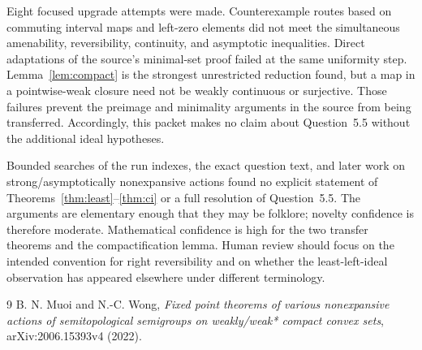 \documentclass[11pt]{article}
\theoremstyle{definition}
\theoremstyle{remark}
\begin{document}
Eight focused upgrade attempts were made.  Counterexample routes based on
commuting interval maps and left-zero elements did not meet the simultaneous
amenability, reversibility, continuity, and asymptotic inequalities.  Direct
adaptations of the source's minimal-set proof failed at the same uniformity
step.  Lemma~\ref{lem:compact} is the strongest unrestricted reduction found,
but a map in a pointwise-weak closure need not be weakly continuous or
surjective.  Those failures prevent the preimage and minimality arguments in
the source from being transferred.  Accordingly, this packet makes no claim
about Question~5.5 without the additional ideal hypotheses.

Bounded searches of the run indexes, the exact question text, and later work
on strong/asymptotically nonexpansive actions found no explicit statement of
Theorems~\ref{thm:least}--\ref{thm:ci} or a full resolution of Question~5.5.
The arguments are elementary enough that they may be folklore; novelty
confidence is therefore moderate.  Mathematical confidence is high for the
two transfer theorems and the compactification lemma.  Human review should
focus on the intended convention for right reversibility and on whether the
least-left-ideal observation has appeared elsewhere under different
terminology.

\begin{thebibliography}{9}
B. N. Muoi and N.-C. Wong,
\emph{Fixed point theorems of various nonexpansive actions of semitopological
semigroups on weakly/weak* compact convex sets}, arXiv:2006.15393v4 (2022).
\end{thebibliography}
\end{document}
